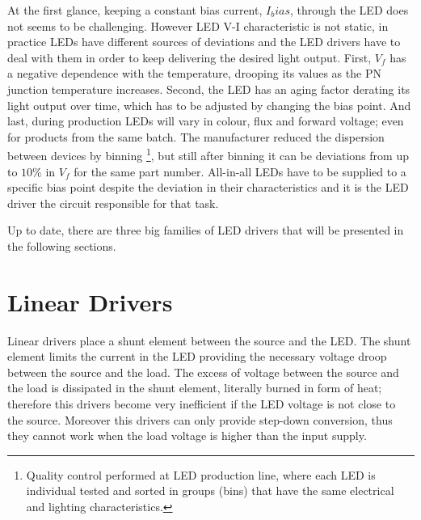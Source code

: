 At the first glance, keeping a constant bias current, $I_bias$, through the LED does not seems to be challenging. However LED V-I characteristic is not static, in practice LEDs have different sources of deviations and the LED drivers have to deal with them in order to keep delivering the desired light output. First, $V_f$ has a negative dependence with the temperature, drooping its values as the PN junction temperature increases. Second, the LED has an aging factor derating its light output over time, which has to be adjusted by changing the bias point. And last, during production LEDs will vary in colour, flux and forward voltage; even for products from the same batch. The manufacturer reduced the dispersion between devices by binning \footnote{Quality control performed at LED production line, where each LED is individual tested and sorted in groups (bins) that have the same electrical and lighting characteristics.}, but still after binning it can be deviations from up to $10\%$ in $V_f$ for the same part number. All-in-all LEDs have to be supplied to a specific bias point despite the deviation in their characteristics and it is the LED driver the circuit responsible for that task.

Up to date, there are three big families of LED drivers that will be presented in the following sections.

\section{Linear Drivers}

 Linear drivers place a shunt element between the source and the LED. The shunt element limits the current in the LED providing the necessary voltage droop between the source and the load. The excess of voltage between the source and the load is dissipated in the shunt element, literally burned in form of heat; therefore this drivers become very inefficient if the LED voltage is not close to the source. Moreover this drivers can only provide step-down conversion, thus they cannot work when the load voltage is higher than the input supply.

